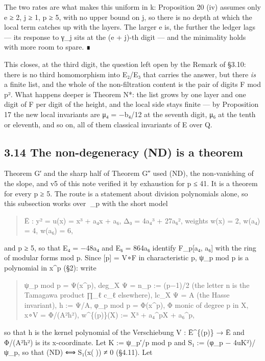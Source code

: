 \documentclass[11pt,a4paper]{article}
\theoremstyle{named}
\begin{document}
The two rates are what makes this uniform in k: Proposition 20 (iv) assumes only e ≥ 2, j ≥ 1, p ≥ 5, with no upper bound on j, so there is no depth at which the local term catches up with the layers. The larger e is, the further the ledger lags — its response to γ\_j sits at the (e + j)-th digit — and the minimality holds with more room to spare. ∎

This closes, at the third digit, the question left open by the Remark of §3.10: there is no third homomorphism into E₂/E₃ that carries the answer, but there \textit{is} a finite list, and the whole of the non-filtration content is the pair of digits F mod p². What happens deeper is Theorem N*: the list grows by one layer and one digit of F per digit of the height, and the local side stays finite — by Proposition 17 the new local invariants are μ₄ = −b₄/12 at the seventh digit, μ₆ at the tenth or eleventh, and so on, all of them classical invariants of E over Q.

\subsection*{3.14 The non-degeneracy (ND) is a theorem}

Theorem G′ and the sharp half of Theorem G″ used (ND), the non-vanishing of the slope, and v5 of this note verified it by exhaustion for p ≤ 41. It is a theorem for every p ≥ 5. The route is a statement about division polynomials alone, so this subsection works over \_p with the short model

\begin{quote}
Ē : y² = u(x) = x³ + a₄x + a₆,  Δ₀ = 4a₄³ + 27a₆²,  weights w(x) = 2, w(a₄) = 4, w(a₆) = 6,
\end{quote}

and p ≥ 5, so that E₄ = −48a₄ and E₆ = 864a₆ identify F\_p[a₄, a₆] with the ring of modular forms mod p. Since [p] = V∘F in characteristic p, ψ\_p mod p is a polynomial in x\textasciicircum{}p (§2): write

\begin{quote}
ψ\_p mod p = Ψ(x\textasciicircum{}p),  deg\_X Ψ = n\_p := (p−1)/2  (the letter n is the Tamagawa product ∏\_ℓ c\_ℓ elsewhere),  lc\_X Ψ = A (the Hasse invariant),  h := Ψ/A, φ\_p mod p = Φ(x\textasciicircum{}p),  Φ monic of degree p in X,  x∘V = Φ/(A²h²),  w\textasciicircum{}\{(p)\}(X) := X³ + a₄\textasciicircum{}pX + a₆\textasciicircum{}p,
\end{quote}

so that h is the kernel polynomial of the Verschiebung V : Ē\textasciicircum{}\{(p)\} → Ē and Φ/(A²h²) is its x-coordinate. Let K := ψ\_p′/p mod p and S₁ := (φ\_p − 4uK²)/ψ\_p, so that (ND) ⟺ S₁(x()) ≠ 0 (§4.11). Let
\end{document}
